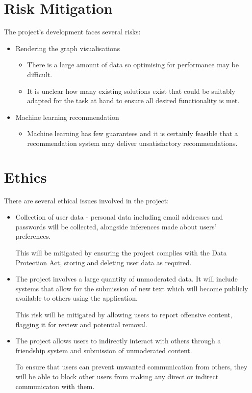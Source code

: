 %
%
\section{Risk Mitigation}


The project's development faces several risks:
\begin{itemize}
    \item Rendering the graph visualisations
        \begin{itemize}
            \item There is a large amount of data so optimising for performance may be difficult.
            \item It is unclear how many existing solutions exist that could be suitably adapted for the task at hand to ensure all desired functionality is met.
        \end{itemize}
    \item Machine learning recommendation
        \begin{itemize}
            \item Machine learning has few guarantees and it is certainly feasible that a recommendation system may deliver unsatisfactory recommendations.
        \end{itemize}
\end{itemize}

%
%
\section{Ethics}

There are several ethical issues involved in the project:
\begin{itemize}
\item Collection of user data - personal data including email addresses and passwords will be collected, alongside inferences made about users' preferences.

This will be mitigated by ensuring the project complies with the Data Protection Act, storing and deleting user data as required. 
\item The project involves a large quantity of unmoderated data. It will include systems that allow for the submission of new text which will become publicly available to others using the application. 

This risk will be mitigated by allowing users to report offensive content, flagging it for review and potential removal.
\item The project allows users to indirectly interact with others through a friendship system and submission of unmoderated content.

To ensure that users can prevent unwanted communication from others, they will be able to block other users from making any direct or indirect communicaton with them.
\end{itemize}
